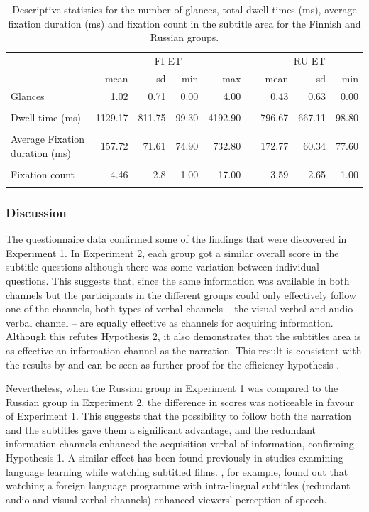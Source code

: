 \documentclass[output=paper]{langsci/langscibook}
\begin{document}
\begin{table}
\small
\begin{tabularx}{\textwidth}{Xrrrrcrrr} 
\lsptoprule
& \multicolumn{4}{c}{ FI-ET} && \multicolumn{3}{c}{ RU-ET}\\
				& mean & sd & min & max && mean & sd & min\\
\midrule
{ Glances} 			& 1.02 	  & 0.71   & 0.00 & 4.00     && 0.43   & 0.63   & 0.00\\ \\
{ Dwell time (ms)} 		& 1129.17 & 811.75 & 99.30 & 4192.90 && 796.67 & 667.11 & 98.80\\ \\
{ Average Fixation duration (ms)}	& 157.72  & 71.61  & 74.90 & 732.80  && 172.77 & 60.34  & 77.60\\ \\
{ Fixation count} 		& 4.46    & 2.8    & 1.00  & 17.00   && 3.59   & 2.65   & 1.00\\  
\lspbottomrule
\end{tabularx}
\caption{Descriptive statistics for the number of glances, total dwell times (ms), average fixation duration (ms) and fixation count in the subtitle area for the Finnish and Russian groups.}
\label{lang:tab:1}
\end{table}

\subsubsection{Discussion}

The questionnaire data confirmed some of the findings that were discovered in Experiment 1. In Experiment 2, each group got a similar overall score in the subtitle questions although there was some variation between individual questions. This suggests that, since the same information was available in both channels but the participants in the different groups could only effectively follow one of the channels, both types of verbal channels -- the visual-verbal and audio-verbal channel -- are equally effective as channels for acquiring information. Although this refutes Hypothesis 2, it also demonstrates that the subtitles area is as effective an information channel as the narration. This result is consistent with the results by \citet{Perego2010} and can be seen as further proof for the efficiency hypothesis \citep{dydewalle1987}. 

Nevertheless, when the Russian group in Experiment 1 was compared to the Russian group in Experiment 2, the difference in scores was noticeable in favour of Experiment 1. This suggests that the possibility to follow both the narration and the subtitles gave them a significant advantage, and the redundant information channels enhanced the acquisition verbal of information, confirming Hypothesis 1. A similar effect has been found previously in studies examining language learning while watching subtitled films. \citet{mitterer2009}, for example, found out that watching a foreign language programme with intra-lingual subtitles (redundant audio and visual verbal channels) enhanced viewers' perception of speech. 
\end{document}
